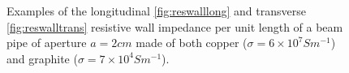 \begin{figure}

\caption{Examples of the longitudinal \ref{fig:reswalllong} and transverse \ref{fig:reswalltrans} resistive wall impedance per unit length of a beam pipe of aperture $a = 2cm$ made of both copper ($\sigma = 6 \times 10^{7} S m^{-1}$) and graphite ($\sigma = 7 \times 10^{4} S m^{-1}$).}
\label{fig:resWallImpComp}
\end{figure}


